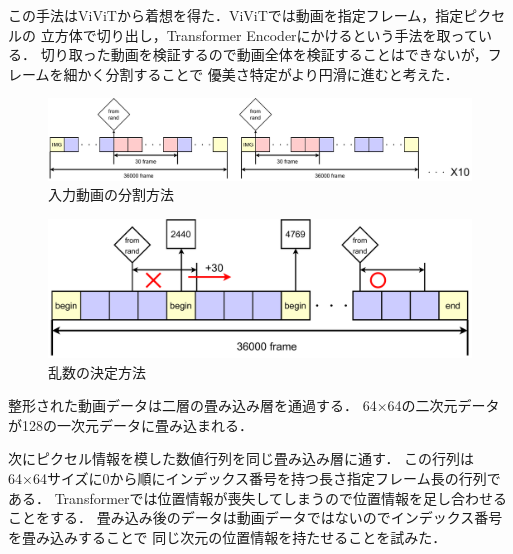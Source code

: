 この手法はViViTから着想を得た．ViViTでは動画を指定フレーム，指定ピクセルの
立方体で切り出し，Transformer Encoderにかけるという手法を取っている．
切り取った動画を検証するので動画全体を検証することはできないが，フレームを細かく分割することで
優美さ特定がより円滑に進むと考えた．

\begin{figure}[b]
  \begin{center}
    \includegraphics[width=120mm]{images/chart/range.pdf}
  \end{center}
  \caption{入力動画の分割方法}
  \label{range}
\end{figure}

\begin{figure}[b]
  \begin{center}
    \includegraphics[width=120mm]{images/chart/decide_rand.pdf}
  \end{center}
  \caption{乱数の決定方法}
  \label{decide_rand}
\end{figure}
\clearpage

整形された動画データは二層の畳み込み層を通過する．
64×64の二次元データが128の一次元データに畳み込まれる．

次にピクセル情報を模した数値行列を同じ畳み込み層に通す．
この行列は64×64サイズに0から順にインデックス番号を持つ長さ指定フレーム長の行列である．
Transformerでは位置情報が喪失してしまうので位置情報を足し合わせることをする．
畳み込み後のデータは動画データではないのでインデックス番号を畳み込みすることで
同じ次元の位置情報を持たせることを試みた．

